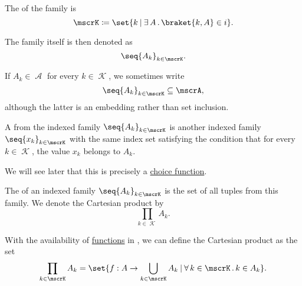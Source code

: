 \begin{definition}
\begin{thmenum}
    The  of the family is
    \begin{equation*}
      \mscrK \coloneqq \set{ k \given \qexists A \braket{ k, A } \in i }.
    \end{equation*}

    The family itself is then denoted as
    \begin{equation*}
      \seq{ A_k }_{k \in \mscrK}.
    \end{equation*}

    If \( A_k \in \mscrA \) for every \( k \in \mscrK \), we sometimes write
    \begin{equation*}
      \seq{ A_k }_{k \in \mscrK} \subseteq \mscrA,
    \end{equation*}
    although the latter is an embedding rather than set inclusion.

     A  from the indexed family \( \seq{ A_k }_{k \in \mscrK} \) is another indexed family \( \seq{ x_k }_{k \in \mscrK} \) with the same index set satisfying the condition that for every \( k \in \mscrK \), the value \( x_k \) belongs to \( A_k \).

    We will see later that this is precisely a \hyperref[def:choice_function]{choice function}.

     The  of an indexed family \( \seq{ A_k }_{k \in \mscrK} \) is the set of all tuples from this family. We denote the Cartesian product by
    \begin{equation*}
      \prod_{k \in \mscrK} A_k.
    \end{equation*}

    With the availability of \hyperref[def:function]{functions} in , we can define the Cartesian product as the set
    \begin{equation*}
      \prod_{k \in \mscrK} A_k = \set{ f: A \to \bigcup_{k \in \mscrK} A_k \given \qforall {k \in \mscrK} k \in A_k }.
    \end{equation*}
  \end{thmenum}
\end{definition}

